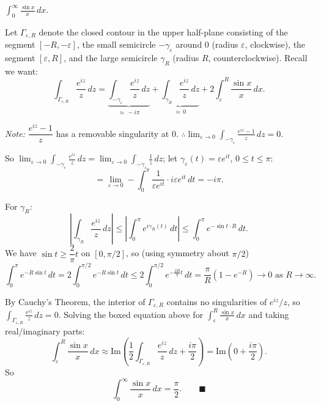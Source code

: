 \documentclass[11pt]{article}
\begin{document}
\begin{example}
$\displaystyle\int_0^\infty \frac{\sin x}{x}\,dx$.

Let $\Gamma_{\varepsilon,R}$ denote the closed contour in the upper half-plane consisting of the segment $[-R,-\varepsilon]$, the small semicircle $-\gamma_\varepsilon$ around $0$ (radius $\varepsilon$, clockwise), the segment $[\varepsilon,R]$, and the large semicircle $\gamma_R$ (radius $R$, counterclockwise). Recall we want:
\[
\int_{\Gamma_{\varepsilon,R}} \frac{e^{iz}}{z}\,dz = \underbrace{\int_{-\gamma_\varepsilon} \frac{e^{iz}}{z}\,dz}_{\approx\,-i\pi} + \underbrace{\int_{\gamma_R} \frac{e^{iz}}{z}\,dz}_{\approx\,0} + 2\int_\varepsilon^R \frac{\sin x}{x}\,dx.
\]

\emph{Note:} $\dfrac{e^{iz}-1}{z}$ has a removable singularity at $0$.
$\therefore \displaystyle\lim_{\varepsilon\to0}\int_{-\gamma_\varepsilon} \frac{e^{iz}-1}{z}\,dz = 0$.

So $\displaystyle\lim_{\varepsilon\to0}\int_{-\gamma_\varepsilon} \frac{e^{iz}}{z}\,dz = \lim_{\varepsilon\to0}\int_{-\gamma_\varepsilon} \frac1z\,dz$; let $\gamma_\varepsilon(t)=\varepsilon e^{it}$, $0\le t\le\pi$:
\[
= \lim_{\varepsilon\to0} -\int_0^\pi \frac{1}{\varepsilon e^{it}}\cdot i\varepsilon e^{it}\,dt = -i\pi.
\]

For $\gamma_R$:
\[
\left|\int_{\gamma_R} \frac{e^{iz}}{z}\,dz\right| \le \left|\int_0^\pi e^{i\gamma_R(t)}\,dt\right| \le \int_0^\pi e^{-\sin t\cdot R}\,dt.
\]
We have $\sin t \ge \dfrac2\pi t$ on $[0,\pi/2]$, so (using symmetry about $\pi/2$)
\[
\int_0^\pi e^{-R\sin t}\,dt = 2\int_0^{\pi/2} e^{-R\sin t}\,dt \le 2\int_0^{\pi/2} e^{-\frac{2R}{\pi}t}\,dt = \frac{\pi}{R}\left(1-e^{-R}\right) \to 0 \text{ as } R\to\infty.
\]

By Cauchy's Theorem, the interior of $\Gamma_{\varepsilon,R}$ contains no singularities of $e^{iz}/z$, so $\int_{\Gamma_{\varepsilon,R}} \frac{e^{iz}}{z}\,dz = 0$. Solving the boxed equation above for $\int_\varepsilon^R \frac{\sin x}{x}\,dx$ and taking real/imaginary parts:
\[
\int_\varepsilon^R \frac{\sin x}{x}\,dx \approx \mathrm{Im}\left(\frac12\int_{\Gamma_{\varepsilon,R}} \frac{e^{iz}}{z}\,dz + \frac{i\pi}{2}\right) = \mathrm{Im}\left(0 + \frac{i\pi}{2}\right).
\]
So
\[
\int_0^\infty \frac{\sin x}{x}\,dx = \frac{\pi}{2}. \qquad \blacksquare
\]
\end{example}
\end{document}
